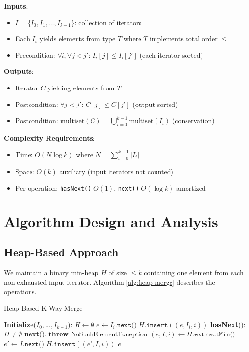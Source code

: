 \documentclass[11pt]{article}
\begin{document}
\textbf{Inputs}:
\begin{itemize}
    \item $I = \{I_0, I_1, \ldots, I_{k-1}\}$: collection of iterators
    \item Each $I_i$ yields elements from type $T$ where $T$ implements total order $\leq$
    \item Precondition: $\forall i, \forall j < j'$: $I_i[j] \leq I_i[j']$ (each iterator sorted)
\end{itemize}

\textbf{Outputs}:
\begin{itemize}
    \item Iterator $C$ yielding elements from $T$
    \item Postcondition: $\forall j < j'$: $C[j] \leq C[j']$ (output sorted)
    \item Postcondition: $\text{multiset}(C) = \bigcup_{i=0}^{k-1} \text{multiset}(I_i)$ (conservation)
\end{itemize}

\textbf{Complexity Requirements}:
\begin{itemize}
    \item Time: $O(N \log k)$ where $N = \sum_{i=0}^{k-1} |I_i|$
    \item Space: $O(k)$ auxiliary (input iterators not counted)
    \item Per-operation: \texttt{hasNext()} $O(1)$, \texttt{next()} $O(\log k)$ amortized
\end{itemize}

\section{Algorithm Design and Analysis}

\subsection{Heap-Based Approach}

We maintain a binary min-heap $H$ of size $\leq k$ containing one element from each non-exhausted input iterator. Algorithm \ref{alg:heap-merge} describes the operations.

\begin{algorithm}
\caption{Heap-Based K-Way Merge}
\label{alg:heap-merge}
\begin{algorithmic}[1]
\State \textbf{Initialize}($I_0, \ldots, I_{k-1}$):
\State $H \gets \emptyset$
        \State $e \gets I_i.\texttt{next()}$
        \State $H.\texttt{insert}((e, I_i, i))$ 
    \EndIf
\EndFor
\State
\State \textbf{hasNext}():
\State \Return $H \neq \emptyset$
\State
\State \textbf{next}():
    \State \textbf{throw} NoSuchElementException
\EndIf
\State $(e, I, i) \gets H.\texttt{extractMin()}$
    \State $e' \gets I.\texttt{next()}$
    \State $H.\texttt{insert}((e', I, i))$
\EndIf
\State \Return $e$
\end{algorithmic}
\end{algorithm}
\end{document}

